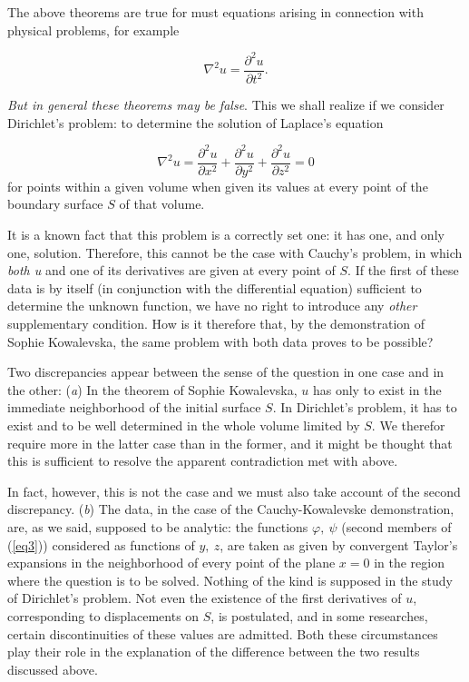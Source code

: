 \documentclass[12pt,oneside]{book}
\begin{document}
The above theorems are true for must equations arising in connection with
physical problems, for example

\begin{equation}
    \tag{E}\label{E}
    \nabla^2u=\frac{\partial^2u}{\partial t^2}.
\end{equation} \par

\textit{But in general these theorems may be false}. This we shall realize if we
consider Dirichlet's problem: to determine the solution of Laplace's equation

\begin{equation}
    \tag{e}\label{e}
    \nabla^2u=\frac{\partial^2u}{\partial x^2}+\frac{\partial^2u}{\partial y^2}+\frac{\partial^2u}{\partial z^2}=0
\end{equation}
for points within a given volume when given its values at every point of the
boundary surface $S$ of that volume. \par

It is a known fact that this problem is a correctly set one: it has one, and
only one, solution. Therefore, this cannot be the case with Cauchy's problem, in
which \textit{both u} and one of its derivatives are given at every point of
$S$. If the first of these data is by itself (in conjunction with the
differential equation) sufficient to determine the unknown function, we have no
right to introduce any \textit{other} supplementary condition. How is it
therefore that, by the demonstration of Sophie Kowalevska, the same problem with
both data proves to be possible? \par

Two discrepancies appear between the sense of the question in one case and in
the other: (\textit{a}) In the theorem of Sophie Kowalevska, $u$ has only to
exist in the immediate neighborhood of the initial surface $S$. In Dirichlet's
problem, it has to exist and to be well determined in the whole volume limited
by $S$. We therefor require more in the latter case than in the former, and it
might be thought that this is sufficient to resolve the apparent contradiction
met with above. \par

In fact, however, this is not the case and we must also take account of the
second discrepancy. (\textit{b}) The data, in the case of the Cauchy-Kowalevske
demonstration, are, as we said, supposed to be analytic: the functions
$\varphi,\ \psi$ (second members of (\ref{eq3})) considered as functions of $y,\
z$, are taken as given by convergent Taylor's expansions in the neighborhood of
every point of the plane $x=0$ in the region where the question is to be solved.
Nothing of the kind is supposed in the study of Dirichlet's problem. Not even
the existence of the first derivatives of $u$, corresponding to displacements on
$S$, is postulated, and in some researches, certain discontinuities of these
values are admitted. Both these circumstances play their role in the explanation
of the difference between the two results discussed above. \par
\end{document}
